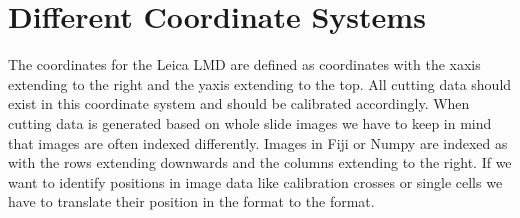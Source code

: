\documentclass[letterpaper,10pt,english,openany,oneside]{sphinxmanual}
\begin{document}
\begin{sphinxVerbatim}[commandchars=\\\{\}]
   
    
   

  \PYG{p}{[}\PYG{p}{[} \PYG{p}{]} \PYG{p}{[} \PYG{p}{]} \PYG{p}{[} \PYG{p}{]}\PYG{p}{]}
    

   \PYG{p}{[} \PYG{p}{]}   
  
\end{sphinxVerbatim}

\noindent{}


\section{Different Coordinate Systems}
\label{\detokenize{pages/quickstart:different-coordinate-systems}}
\sphinxAtStartPar
The coordinates for the Leica LMD are defined as  coordinates with the x\sphinxhyphen{}axis extending to the right and the y\sphinxhyphen{}axis extending to the top. All cutting data should exist in this coordinate system and should be calibrated accordingly. When cutting data is generated based on whole slide images we have to keep in mind that images are often indexed differently. Images in Fiji or Numpy are indexed as  with the rows extending downwards and the columns extending to the right. If we want to identify positions in image data \sphinxhyphen{} like calibration crosses or single cells \sphinxhyphen{} we have to translate their position in the  format to the  format.
\end{document}
